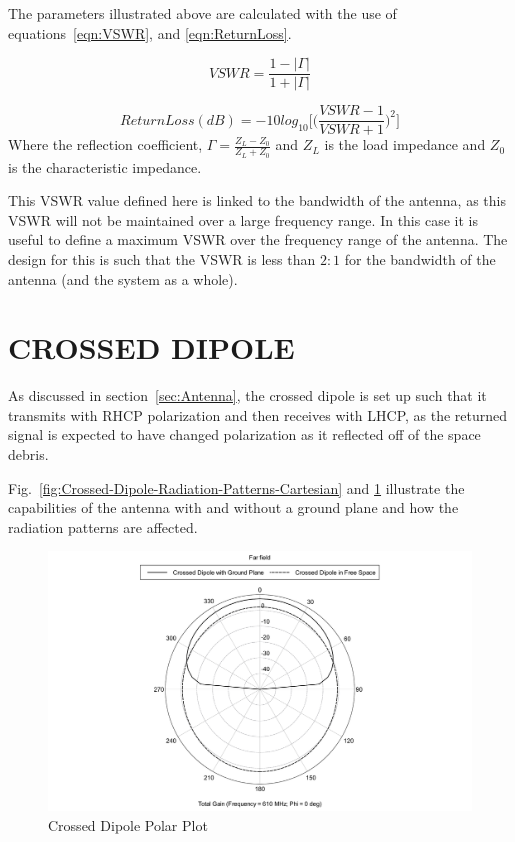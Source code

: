 \documentclass[11pt]{witseiepaper}
\begin{document}
\begin{bibunit}[witseie]
The parameters illustrated above are calculated with the use of equations~\ref{eqn:VSWR}, and \ref{eqn:ReturnLoss}.


\begin{equation} \label{eqn:VSWR}
VSWR = \frac{1 - |\Gamma|}{1 + |\Gamma|}
\end{equation}

\begin{equation} \label{eqn:ReturnLoss}
Return Loss (dB) = -10 log_{10} \Bigg[ \Big(\frac{VSWR - 1}{VSWR + 1} \Big)^2 \Bigg]
\end{equation}
Where the reflection coefficient, $\Gamma = \frac{Z_L - Z_0}{Z_L + Z_0}$ and $Z_L$ is the load impedance and $Z_0$ is the characteristic impedance.

This VSWR value defined here is linked to the bandwidth of the antenna, as this VSWR will not be maintained over a large frequency range. In this case it is useful to define a maximum VSWR over the frequency range of the antenna. The design for this is such that the VSWR is less than $2:1$ for the bandwidth of the antenna (and the system as a whole).

\section{CROSSED DIPOLE} \label{sec:Crossed-Dipole}
As discussed in section~\ref{sec:Antenna}, the crossed dipole is set up such that it transmits with RHCP polarization and then receives with LHCP, as the returned signal is expected to have changed polarization as it reflected off of the space debris.

Fig.~\ref{fig:Crossed-Dipole-Radiation-Patterns-Cartesian} and \ref{fig:Crossed-Dipole-Radiation-Patterns-Polar} illustrate the capabilities of the antenna with and without a ground plane and how the radiation patterns are affected.
\begin{figure}[htb]
    \centering
    \includegraphics[width=\linewidth]{Crossed-Dipole-Polar.pdf}
    \caption{Crossed Dipole Polar Plot}
    \label{fig:Crossed-Dipole-Radiation-Patterns-Polar}
\end{figure}



\end{bibunit}
\end{document}
